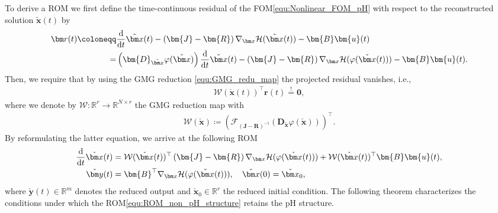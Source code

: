 \documentclass{article}
\newcommand{\bmB}{\bm{B}}
\newcommand{\bmD}{\bm{D}}
\newcommand{\R}{\mathbb{R}}
\newcommand{\curlyH}{\mathcal{H}}
\newcommand{\statex}{{\bm x}}
\newcommand{\stateapprox}{\tilde{\bm x}}
\newcommand{\stateRed}{\check{\bm x}}
\newcommand{\outputRed}{\check{\bm y}}
\newcommand{\stateRedT}{\stateRed(t)}
\newcommand{\outputRedT}{\outputRed(t)}
\newcommand{\inputu}{\bm{u}}
\newcommand{\ddt}{\frac{\rm d}{{\rm d} t}}
\newcommand{\bzero}{\mathbf{0}}
\newcommand{\portsize}{m}
\newcommand{\FOMsize}{N}
\newcommand{\ROMsize}{r}
\newcommand{\approxfunc}{\varphi}
\newcommand{\matfunc}{\mathcal{F}}
\newcommand{\funcW}{\mathcal{W}}
\newcommand{\funcJ}{\bm{J}}
\newcommand{\funcR}{\bm{R}}
\newcommand{\residual}{{\bm r}}
\newcommand{\pH}{\textsf{pH}\xspace}
\newcommand{\GMG}{\textsf{GMG}\xspace}
\newcommand{\FOM}{\textsf{FOM}\xspace}
\newcommand{\ROM}{\textsf{ROM}\xspace}
\begin{document}
To derive a \ROM we first define the time-continuous residual of the \FOM \eqref{equ:Nonlinear_FOM_pH} with respect to the reconstructed solution $\stateapprox(t)$ by
\begin{align*}
	\residual(t)\coloneqq &\ddt \stateapprox(t)-\left(\funcJ-\funcR\right)\nabla_{\statex}\curlyH(\stateapprox(t)) -\bmB\inputu(t) \\
	=  &\left( \bmD_{\stateRed}\approxfunc(\stateRed) \right) \ddt \stateRedT -\left(\funcJ-\funcR\right)\nabla_{\statex}\curlyH(\approxfunc(\stateRedT)) -\bmB\inputu(t). 
\end{align*} 
Then, we require that by using the \GMG reduction \eqref{equ:GMG_redu_map} the projected residual vanishes, i.e., 
\begin{align*}
	\funcW(\stateRedT)^{\top}\residual(t) \overset{!}{=} \bzero, 
\end{align*}
where we denote by $\funcW\colon\R^{\ROMsize}\rightarrow\R^{\FOMsize\times\ROMsize}$ the \GMG reduction map with 
\begin{align}
	\label{equ:GMG_NL_Construct_W}
	\funcW\left( \stateRed \right) \coloneq \left(\matfunc_{\left(\funcJ-\funcR\right)^{-1}} \left(\bmD_{\stateRed}\approxfunc(\stateRed) \right) \right)^{\top}.
\end{align}
By reformulating the latter equation, we arrive at the following \ROM
\begin{subequations}\label{equ:ROM_non_pH_structure}
\begin{align}
	\ddt \stateRedT &=
	\funcW(\stateRedT)^{\top}\left(\funcJ-\funcR \right)\nabla_{\statex}\curlyH(\approxfunc(\stateRedT)) + \funcW(\stateRedT)^{\top}\bmB\inputu(t),\label{equ:ROM_non_pH_structure_A}\\
	\outputRedT&=\bmB^{\top}\nabla_{\statex}\curlyH(\approxfunc(\stateRedT)), \quad \stateRed(0) = \stateRed_0 , \label{equ:ROM_non_pH_structure_B}
\end{align}
\end{subequations}
where $\outputRedT \in \R^{\portsize}$ denotes the reduced output and $\stateRed_0 \in \R^{r}$ the reduced initial condition. The following theorem characterizes the conditions under which the \ROM \eqref{equ:ROM_non_pH_structure} retains the \pH structure.
\end{document}
